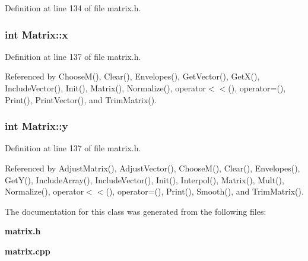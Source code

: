 Definition at line 134 of file matrix.h.
\subsubsection{\setlength{\rightskip}{0pt plus 5cm}int {\bf Matrix::x}\hspace{0.3cm}{\tt  [private]}}\label{classMatrix_r2}




Definition at line 137 of file matrix.h.

Referenced by Choose\-M(), Clear(), Envelopes(), Get\-Vector(), Get\-X(), Include\-Vector(), Init(), Matrix(), Normalize(), operator$<$$<$(), operator=(), Print(), Print\-Vector(), and Trim\-Matrix().
\subsubsection{\setlength{\rightskip}{0pt plus 5cm}int {\bf Matrix::y}\hspace{0.3cm}{\tt  [private]}}\label{classMatrix_r3}




Definition at line 137 of file matrix.h.

Referenced by Adjust\-Matrix(), Adjust\-Vector(), Choose\-M(), Clear(), Envelopes(), Get\-Y(), Include\-Array(), Include\-Vector(), Init(), Interpol(), Matrix(), Mult(), Normalize(), operator$<$$<$(), operator=(), Print(), Smooth(), and Trim\-Matrix().

The documentation for this class was generated from the following files:\begin{CompactItemize}
\item 
{\bf matrix.h}\item 
{\bf matrix.cpp}\end{CompactItemize}
